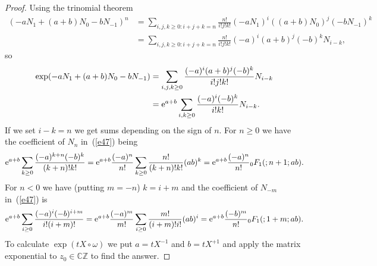 \documentclass[pdftex]{sigma}
\numberwithin{equation}{section}
\newcommand{\C}{\mathbb{C}}
\newcommand{\Z}{\mathbb{Z}}
\newcommand{\<}{\langle}
\renewcommand{\>}{\rangle}
\begin{document}
\begin{proof}
	Using the trinomial theorem
	\begin{align*}
	(-a N_{1}+(a+b)N_{0}-bN_{-1})^{n}&=\sum_{i,j,k\geq 0:i+j+k=n} \frac{n!}{i! j! k!} (-a N_{1})^{i}((a+b)N_{0})^{j}(-bN_{-1})^{k}\\
	&=\sum_{i,j,k\geq 0:i+j+k=n} \frac{n!}{i! j! k!} (-a)^{i}(a+b)^{j}(-b)^{k} N_{i-k},
	\end{align*}
	so
	\begin{align}
	\exp (-a N_{1}+(a+b)N_{0}-bN_{-1})&=\sum_{i,j,k\geq 0}\frac{(-a)^{i}(a+b)^{j}(-b)^{k} }{i! j! k!} N_{i-k}\nonumber\\
	&={\rm e}^{a+b}\sum_{i,k\geq 0}\frac{(-a)^{i}(-b)^{k} }{i! k!}N_{i-k}.\label{e47}
	\end{align}
	If we set $ i-k =n$ we get sums depending on the sign of $ n $. For $ n \geq 0 $ we have the coefficient of $ N_{n} $ in~(\ref{e47}) being
	\begin{gather*}%
	{\rm e}^{a+b}\sum_{k\geq 0}\frac{(-a)^{k+n}(-b)^{k} }{(k+n)! k!}=	{\rm e}^{a+b}\frac{(-a)^{n}}{n!}\sum_{k\geq 0}\frac{n! }{(k+n)! k!}(a b)^{k}=	{\rm e}^{a+b}\frac{(-a)^{n}}{n!}{}_{0}F_{1}(;n+1 ;ab).
	\end{gather*}
	For $ n< 0 $ we have (putting $ m=-n $) $ k=i+m $ and the coefficient of $ N_{-m} $ in~(\ref{e47}) is
	\begin{gather*}
	{\rm e}^{a+b}\sum_{i\geq 0}\frac{(-a)^{i}(-b)^{i+m} }{i! (i+m)! }=	{\rm e}^{a+b}\frac{(-a)^{m}}{m!}\sum_{i\geq 0}\frac{m! }{(i+m)! i!}(a b)^{i}= {\rm e}^{a+b}\frac{(-b)^{m}}{n!}{}_{0}F_{1}(;1+m ;ab).
	\end{gather*}
To calculate $ \exp (t X \circ \omega) $ we put $ a=tX^{-1} $ and $ b=tX^{+1} $ and apply the matrix exponential to $ z_{0}\in \C \Z $ to find the answer.
\end{proof}
\end{document}
